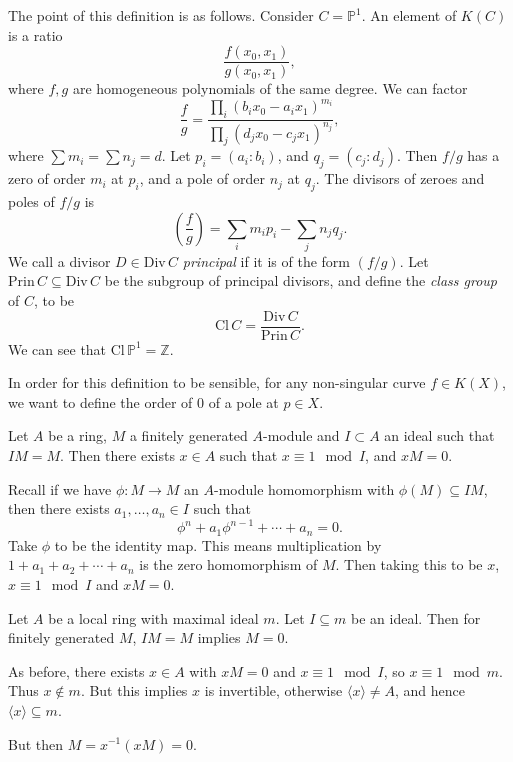 \documentclass[12pt]{article}
\begin{document}
The point of this definition is as follows. Consider $C = \mathbb{P}^1$. An element of $K(C)$ is a ratio
\[
\frac{f(x_0, x_1)}{g(x_0, x_1)},
\]
where $f, g$ are homogeneous polynomials of the same degree. We can factor
\[
	\frac{f}{g} = \frac{\prod_i (b_i x_0 - a_i x_1)^{m_i}}{\prod_j (d_j x_0 - c_j x_1)^{n_j}},
\]
where $\sum m_i = \sum n_j = d$. Let $p_i = (a_i : b_i)$, and $q_j = (c_j : d_j)$. Then $f/g$ has a zero of order $m_i$ at $p_i$, and a pole of order $n_j$ at $q_j$. The divisors of zeroes and poles of $f/g$ is
\[
	\left( \frac{f}{g} \right) = \sum_{i} m_i p_i - \sum_j n_j q_j.
\]
We call a divisor $D \in \mathrm{Div} \, C$ \emph{principal} if it is of the form $(f/g)$. Let $\mathrm{Prin}\, C \subseteq \mathrm{Div}\, C$ be the subgroup of principal divisors, and define the \emph{class group} of $C$, to be
\[
\mathrm{Cl}\, C = \frac{\mathrm{Div}\, C}{\mathrm{Prin}\, C}.
\]
We can see that $\mathrm{Cl}\, \mathbb{P}^1 = \mathbb{Z}$.

In order for this definition to be sensible, for any non-singular curve $f \in K(X)$, we want to define the order of $0$ of a pole at $p \in X$.

\begin{lemma}
	Let $A$ be a ring, $M$ a finitely generated $A$-module and $I \subset A$ an ideal such that $I M = M$. Then there exists $x \in A$ such that $x \equiv 1 \mod I$, and $x M = 0$.
\end{lemma}

\begin{proofbox}
	Recall if we have $\phi : M \to M$ an $A$-module homomorphism with $\phi(M) \subseteq IM$, then there exists $a_1, \ldots, a_n \in I$ such that
	\[
	\phi^n + a_1 \phi^{n-1} + \cdots + a_n = 0.
	\]
	Take $\phi$ to be the identity map. This means multiplication by $1 + a_1 + a_2 + \cdots + a_n$ is the zero homomorphism of $M$. Then taking this to be $x$, $x \equiv 1 \mod I$ and $x M = 0$.
\end{proofbox}

\begin{theorem}
	Let $A$ be a local ring with maximal ideal $m$. Let $I \subseteq m$ be an ideal. Then for finitely generated $M$, $I M = M$ implies $M = 0$.
\end{theorem}

\begin{proofbox}
	As before, there exists $x \in A$ with $x M = 0$ and $x \equiv 1 \mod I$, so $x \equiv 1 \mod m$. Thus $x \not \in m$. But this implies $x$ is invertible, otherwise $\langle x \rangle \neq A$, and hence $\langle x \rangle \subseteq m$.

	But then $M = x^{-1}( x M) = 0$.
\end{proofbox}
\end{document}
